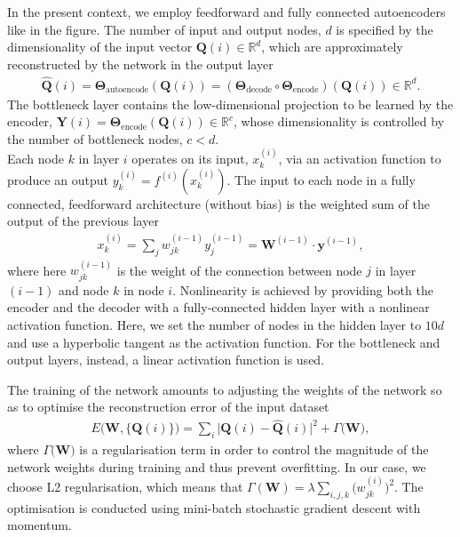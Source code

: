 \documentclass{article}
\begin{document}
In the present context, we employ feedforward and fully connected autoencoders like in the figure. The number of input and output nodes, $d$ is specified by the dimensionality of the input vector $\bm{Q}(i)\in\mathbb{R}^d$, which are approximately reconstructed by the network in the output layer 
\begin{align}
	\hat{\bm{Q}}(i)=\bm{\Theta}_{\text{autoencode}}(\bm{Q}(i))=(\bm{\Theta}_{\text{decode}}\circ\bm{\Theta}_{\text{encode}})(\bm{Q}(i))\in\mathbb{R}^d.
\end{align}
The bottleneck layer contains the low-dimensional projection to be learned by the encoder, $\bm{Y}(i)=\bm{\Theta}_{\text{encode}}(\bm{Q}(i))\in\mathbb{R}^c$, whose dimensionality is controlled by the number of bottleneck nodes, $c<d$. 
\\

Each node $k$ in layer $i$ operates on its input, $x_k^{(i)}$, via an activation function to produce an output $y_k^{(i)}=f^{(i)}(x_k^{(i)})$. The input to each node in a fully connected, feedforward architecture (without bias) is the weighted sum of the output of the previous layer
\begin{align}
	x_k^{(i)}=\sum_{j}w_{jk}^{(i-1)}y_j^{(i-1)}=\bm{W}^{(i-1)}\cdot \bm{y}^{(i-1)},
\end{align}
where here $w^{(i-1)}_{jk}$ is the weight of the connection between node $j$ in layer $(i-1)$ and node $k$ in node $i$.
Nonlinearity is achieved by providing both the encoder and the decoder with a fully-connected hidden layer with a nonlinear activation function. Here, we set the number of nodes in the hidden layer to $10d$ and use a hyperbolic tangent as the activation function. For the bottleneck and output layers, instead, a linear activation function is used.

The training of the network amounts to adjusting the weights of the network so as to optimise the reconstruction error of the input dataset
\begin{align}
	E\big(\bm{W}, \{\bm{Q}(i)\}\big)=\sum_{i}\big|\bm{Q}(i)-\bm{\hat Q}(i)\big|^2+\Gamma\big(\bm{W}\big),
\end{align}
where $\Gamma\big(\bm{W}\big)$ is a regularisation term in order to control the magnitude of the network weights during training and thus prevent overfitting. In our case, we choose L2 regularisation, which means that $\Gamma(\bm{W})=\lambda\sum_{i,j,k}\big(w_{jk}^{(i)}\big)^2$. The optimisation is conducted using mini-batch stochastic gradient descent with momentum.
\end{document}
